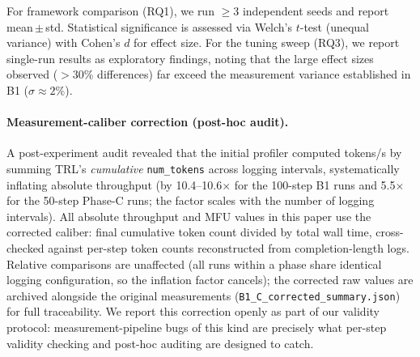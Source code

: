 For framework comparison (RQ1), we run $\geq$3 independent seeds and report mean\,$\pm$\,std. Statistical significance is assessed via Welch's $t$-test (unequal variance) with Cohen's $d$ for effect size. For the tuning sweep (RQ3), we report single-run results as exploratory findings, noting that the large effect sizes observed ($>$30\% differences) far exceed the measurement variance established in B1 ($\sigma \approx 2\%$).

\paragraph{Measurement-caliber correction (post-hoc audit).} A post-experiment audit revealed that the initial profiler computed tokens/s by summing TRL's \emph{cumulative} \texttt{num\_tokens} across logging intervals, systematically inflating absolute throughput (by 10.4--10.6$\times$ for the 100-step B1 runs and 5.5$\times$ for the 50-step Phase-C runs; the factor scales with the number of logging intervals). All absolute throughput and MFU values in this paper use the corrected caliber: final cumulative token count divided by total wall time, cross-checked against per-step token counts reconstructed from completion-length logs. Relative comparisons are unaffected (all runs within a phase share identical logging configuration, so the inflation factor cancels); the corrected raw values are archived alongside the original measurements (\texttt{B1\_C\_corrected\_summary.json}) for full traceability. We report this correction openly as part of our validity protocol: measurement-pipeline bugs of this kind are precisely what per-step validity checking and post-hoc auditing are designed to catch.
